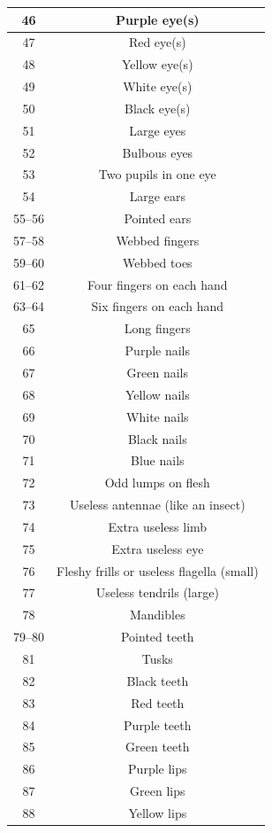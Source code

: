 \begin{longtable}{| c | c |}
46 & Purple eye(s)  \\ \hline
47 & Red eye(s)  \\ \hline
48 & Yellow eye(s)  \\ \hline
49 & White eye(s)  \\ \hline
50 & Black eye(s)  \\ \hline
51 & Large eyes  \\ \hline
52 & Bulbous eyes  \\ \hline
53 & Two pupils in one eye  \\ \hline
54 & Large ears  \\ \hline
55–56 & Pointed ears  \\ \hline
57–58 & Webbed fingers  \\ \hline
59–60 & Webbed toes  \\ \hline
61–62 & Four fingers on each hand  \\ \hline
63–64 & Six fingers on each hand  \\ \hline
65 & Long fingers  \\ \hline
66 & Purple nails  \\ \hline
67 & Green nails  \\ \hline
68 & Yellow nails  \\ \hline
69 & White nails  \\ \hline
70 & Black nails  \\ \hline
71 & Blue nails  \\ \hline
72 & Odd lumps on flesh  \\ \hline
73 & Useless antennae (like an insect)  \\ \hline
74 & Extra useless limb  \\ \hline
75 & Extra useless eye  \\ \hline
76 & Fleshy frills or useless flagella (small)  \\ \hline
77 & Useless tendrils (large)  \\ \hline
78 & Mandibles  \\ \hline
79–80 & Pointed teeth  \\ \hline
81 & Tusks  \\ \hline
82 & Black teeth  \\ \hline
83 & Red teeth  \\ \hline
84 & Purple teeth  \\ \hline
85 & Green teeth  \\ \hline
86 & Purple lips  \\ \hline
87 & Green lips  \\ \hline
88 & Yellow lips  \\ \hline

\end{longtable}
